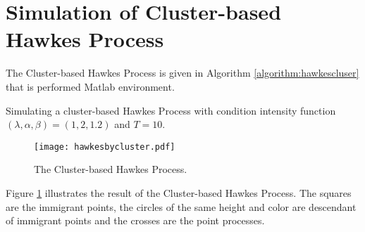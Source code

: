 \section{Simulation of Cluster-based Hawkes Process}
The Cluster-based Hawkes Process is given in Algorithm \ref{algorithm:hawkescluser} that is performed Matlab\textsuperscript{\textregistered} environment.

\begin{example}
	\label{example:hawkescluster}
	Simulating a cluster-based Hawkes Process with condition intensity function $(\lambda,\alpha,\beta)=(1,2,1.2)$ and $T=10$.
\end{example}
%
\begin{figure}[H]
	\centering
	\texttt{[image: hawkesbycluster.pdf]}
	\caption[The Cluster-based Hawkes Process.]{The Cluster-based Hawkes Process.}
	\label{figure:hawkescluster}
\end{figure}
Figure \ref{figure:hawkescluster} illustrates the result of the Cluster-based Hawkes Process. The squares are the immigrant points, the circles of the same height and color are descendant of immigrant points and the crosses are the point processes.